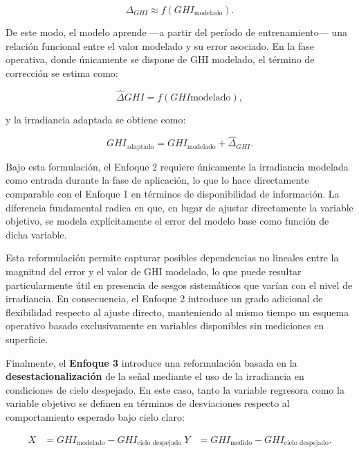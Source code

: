 \begin{equation}
\Delta_{GHI} \approx f\left(GHI_{\text{modelado}}\right).
\end{equation}

De este modo, el modelo aprende —a partir del período de entrenamiento— una relación funcional entre el valor modelado y su error asociado. En la fase operativa, donde únicamente se dispone de GHI modelado, el término de corrección se estima como:

\begin{equation}
\widehat{\Delta}{GHI} = f\left(GHI{\text{modelado}}\right),
\end{equation}

y la irradiancia adaptada se obtiene como:

\begin{equation}
GHI_{\text{adaptado}} = GHI_{\text{modelado}} + \widehat{\Delta}_{GHI}.
\label{eq:approach2}
\end{equation}

Bajo esta formulación, el Enfoque 2 requiere únicamente la irradiancia modelada como entrada durante la fase de aplicación, lo que lo hace directamente comparable con el Enfoque 1 en términos de disponibilidad de información. La diferencia fundamental radica en que, en lugar de ajustar directamente la variable objetivo, se modela explícitamente el error del modelo base como función de dicha variable.

Esta reformulación permite capturar posibles dependencias no lineales entre la magnitud del error y el valor de GHI
modelado, lo que puede resultar particularmente útil en presencia de sesgos sistemáticos que varían con el nivel de irradiancia. En consecuencia, el Enfoque 2 introduce un grado adicional de flexibilidad respecto al ajuste directo, manteniendo al mismo tiempo un esquema operativo basado exclusivamente en variables disponibles sin mediciones en superficie.

Finalmente, el \textbf{Enfoque 3} introduce una reformulación basada en la \textbf{desestacionalización} de la señal mediante el uso de la irradiancia en condiciones de cielo despejado. En este caso, tanto la variable regresora como la variable objetivo se definen en términos de desviaciones respecto al comportamiento esperado bajo cielo claro:

\begin{align}
X &= GHI_{\text{modelado}} - GHI_{\text{cielo despejado}} \
Y &= GHI_{\text{medido}} - GHI_{\text{cielo despejado}}.
\end{align}

